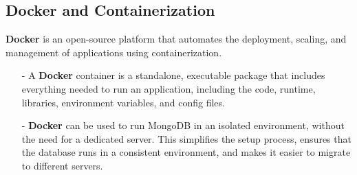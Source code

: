 \subsection{Docker and Containerization}

\textbf{Docker} is an open-source platform that automates the deployment, scaling, and management of applications using containerization.
\begin{itemize}
    \item[-] A \textbf{Docker} container is a standalone, executable package that includes everything needed to run an application, including the code, runtime, libraries, environment variables, and config files.
    \item[-] \textbf{Docker} can be used to run MongoDB in an isolated environment, without the need for a dedicated server. This simplifies the setup process, ensures that the database runs in a consistent environment, and makes it easier to migrate to different servers.

\end{itemize}